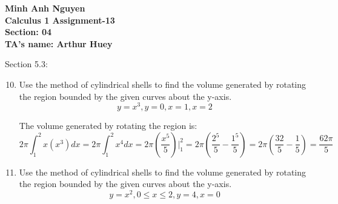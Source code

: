 \documentclass[12pt]{article}
\begin{document}
\textbf{Minh Anh Nguyen }\\
\textbf{Calculus 1 Assignment-13}\\
\textbf{Section: 04}\\
\textbf{TA's name: Arthur Huey}

\hrulefill

Section 5.3:

\begin{enumerate}
\setcounter{enumi}{9}
    \item Use the method of cylindrical shells to find the volume generated by rotating the region bounded by the given curves about the y-axis.
    \[y=x^3,y=0,x=1,x=2\]
    \begin{center}
    \end{center}
    The volume generated by rotating the region is:
    \[2\pi\int_1^2 x(x^3) dx = 2\pi\int_1^2 x^4 dx = 2\pi(\frac{x^5}{5})|_1^2 = 2\pi(\frac{2^5}{5} - \frac{1^5}{5}) = 2\pi(\frac{32}{5} - \frac{1}{5}) = \frac{62\pi}{5}\]

\setcounter{enumi}{11}
    \item Use the method of cylindrical shells to find the volume generated by rotating the region bounded by the given curves about the y-axis.
    \[y=x^2, 0\leq x \leq 2,y =4 ,x=0\]
    \begin{center}
\end{center}
\end{enumerate}
\end{document}

